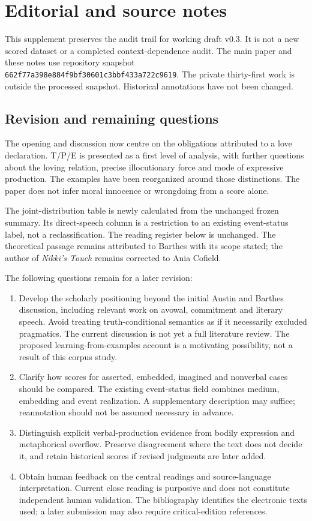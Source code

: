 \section{Editorial and source notes}

This supplement preserves the audit trail for working draft v0.3. It is not a new scored dataset or a completed context-dependence audit. The main paper and these notes use repository snapshot \nolinkurl{662f77a398e884f9bf30601c3bbf433a722c9619}. The private thirty-first work is outside the processed snapshot. Historical annotations have not been changed.

\subsection{Revision and remaining questions}

The opening and discussion now centre on the obligations attributed to a love declaration. T/P/E is presented as a first level of analysis, with further questions about the loving relation, precise illocutionary force and mode of expressive production. The examples have been reorganized around those distinctions. The paper does not infer moral innocence or wrongdoing from a score alone.

The joint-distribution table is newly calculated from the unchanged frozen summary. Its direct-speech column is a restriction to an existing event-status label, not a reclassification. The reading register below is unchanged. The theoretical passage remains attributed to Barthes with its scope stated; the author of \emph{Nikki's Touch} remains corrected to Ania Cofield.

The following questions remain for a later revision:
\begin{enumerate}
\item Develop the scholarly positioning beyond the initial Austin and Barthes discussion, including relevant work on avowal, commitment and literary speech. Avoid treating truth-conditional semantics as if it necessarily excluded pragmatics. The current discussion is not yet a full literature review. The proposed learning-from-examples account is a motivating possibility, not a result of this corpus study.
\item Clarify how scores for asserted, embedded, imagined and nonverbal cases should be compared. The existing event-status field combines medium, embedding and event realization. A supplementary description may suffice; reannotation should not be assumed necessary in advance.
\item Distinguish explicit verbal-production evidence from bodily expression and metaphorical overflow. Preserve disagreement where the text does not decide it, and retain historical scores if revised judgments are later added.
\item Obtain human feedback on the central readings and source-language interpretation. Current close reading is purposive and does not constitute independent human validation. The bibliography identifies the electronic texts used; a later submission may also require critical-edition references.
\end{enumerate}

